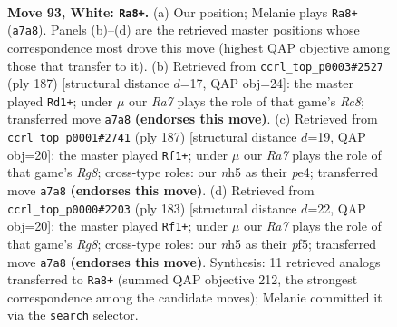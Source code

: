 \documentclass[11pt]{article}
\begin{document}
\clearpage

\begin{figure}[p]\centering
\begin{subfigure}{0.46\textwidth}\centering
\resizebox{\linewidth}{!}{%
\newchessgame
\chessboard[
  setfen={6k1/R7/8/7n/p6r/P7/7p/7K w - - 12 93},
  showmover=false,
  pgfstyle=straightmove, color=movearrow, markmove={a7-a8}
]}
\caption{}
\end{subfigure}\hfill
\begin{subfigure}{0.46\textwidth}\centering
\resizebox{\linewidth}{!}{%
\newchessgame
\chessboard[
  setfen={8/k7/P7/R1P5/3K4/8/8/2r5 b - - 28 94},
  showmover=false,
  pgfstyle=straightmove, color=movearrow, markmove={c1-d1}
]}
\caption{}
\end{subfigure}
\\[4pt]
\begin{subfigure}{0.46\textwidth}\centering
\resizebox{\linewidth}{!}{%
\newchessgame
\chessboard[
  setfen={8/6k1/4R1P1/8/4PK2/8/8/6r1 b - - 64 94},
  showmover=false,
  pgfstyle=straightmove, color=movearrow, markmove={g1-f1}
]}
\caption{}
\end{subfigure}\hfill
\begin{subfigure}{0.46\textwidth}\centering
\resizebox{\linewidth}{!}{%
\newchessgame
\chessboard[
  setfen={8/7k/7P/5P2/8/5K1R/8/6r1 b - - 0 92},
  showmover=false,
  pgfstyle=straightmove, color=movearrow, markmove={g1-f1}
]}
\caption{}
\end{subfigure}
\caption{\textbf{Move 93, White: \texttt{Ra8+}.} (a) Our position; Melanie plays \texttt{Ra8+} (\texttt{a7a8}). Panels (b)--(d) are the retrieved master positions whose correspondence most drove this move (highest QAP objective among those that transfer to it). (b) Retrieved from \texttt{ccrl\_top\_p0003\#2527} (ply 187) [structural distance $d$=17, QAP obj=24]: the master played \texttt{Rd1+}; under $\mu$ our \emph{Ra7} plays the role of that game's \emph{Rc8}; transferred move \texttt{a7a8} \textbf{(endorses this move)}. (c) Retrieved from \texttt{ccrl\_top\_p0001\#2741} (ply 187) [structural distance $d$=19, QAP obj=20]: the master played \texttt{Rf1+}; under $\mu$ our \emph{Ra7} plays the role of that game's \emph{Rg8}; cross-type roles: our \emph{n}h5 as their \emph{p}e4; transferred move \texttt{a7a8} \textbf{(endorses this move)}. (d) Retrieved from \texttt{ccrl\_top\_p0000\#2203} (ply 183) [structural distance $d$=22, QAP obj=20]: the master played \texttt{Rf1+}; under $\mu$ our \emph{Ra7} plays the role of that game's \emph{Rg8}; cross-type roles: our \emph{n}h5 as their \emph{p}f5; transferred move \texttt{a7a8} \textbf{(endorses this move)}. Synthesis: 11 retrieved analogs transferred to \texttt{Ra8+} (summed QAP objective 212, the strongest correspondence among the candidate moves); Melanie committed it via the \texttt{search} selector.}
\label{fig:thought-m184}
\end{figure}
\end{document}
